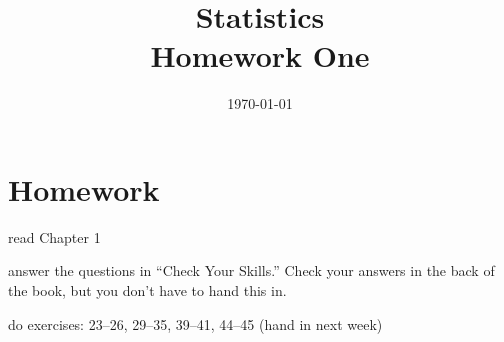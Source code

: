 \documentclass[letterpaper, landscape]{exam}
\title{Statistics \\ Homework One}
\author{}
\date{\today}
\begin{document}
  \maketitle

  \section{Homework}

  \begin{itemize*}
    \item read Chapter 1 
    \item answer the questions in ``Check Your Skills.''  Check your answers
      in the back of the book, but you don't have to hand this in.
    \item do exercises: 23--26, 29--35, 39--41, 44--45 (hand in next week)
  \end{itemize*}

  \ifprintanswers{}
\end{document}
